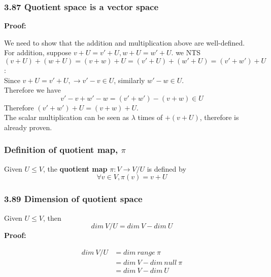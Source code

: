 \documentclass{article}
\begin{document}
\subsubsection*{3.87 Quotient space is a vector space}
\textbf{Proof:}
\begin{addmargin}[1em]{0em}
    We need to show that the addition and multiplication above are well-defined.\\
    For addition, suppose $v+U = v'+U, w+U = w'+U$. we NTS $(v+U)+(w+U)=(v+w)+U = (v'+U)+(w'+U) = (v'+w')+U$:\\
    Since $v+U = v'+U, \rightarrow v' - v \in U$, similarly $w' - w \in U$.\\
    Therefore we have
    \begin{equation*}
        v' - v + w' - w = (v'+w') - (v+w) \in U
    \end{equation*}
    Therefore $(v'+w')+U = (v+w)+U$.\\
    The scalar multiplication can be seen as $\lambda$ times of $+ (v+U)$, therefore is already proven.
\end{addmargin}
\subsubsection*{Definition of quotient map, $\pi$}
Given $U \leq V$, the \textbf{quotient map} $\pi:V \rightarrow V/U$ is defined by
\begin{equation*}
    \forall v \in V, \pi(v) = v+U
\end{equation*}
\subsubsection*{3.89 Dimension of quotient space}
Given $U \leq V$, then
\begin{equation*}
    dim\ V/U = dim\ V - dim\ U
\end{equation*}
\textbf{Proof:}
\begin{addmargin}[1em]{0em}
    \begin{equation*}
        \begin{split}
            dim\ V/U &= dim\ range\ \pi\\
            &= dim\ V - dim\ null\ \pi\\
            &= dim\ V - dim\ U
        \end{split}
    \end{equation*}
\end{addmargin}
\end{document}
